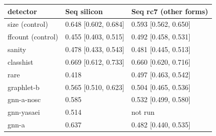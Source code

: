 \begin{tabular}{lll}
\hline
detector & Seq silicon & Seq rc7 (other forms) \\
\hline
size (control) & 0.648 [0.602, 0.684] & 0.593 [0.562, 0.650] \\
ffcount (control) & 0.455 [0.403, 0.515] & 0.492 [0.458, 0.531] \\
sanity & 0.478 [0.433, 0.543] & 0.481 [0.445, 0.513] \\
classhist & 0.669 [0.612, 0.733] & 0.660 [0.620, 0.716] \\
rare & 0.418 & 0.497 [0.463, 0.542] \\
graphlet{-}b & 0.565 [0.510, 0.623] & 0.504 [0.465, 0.536] \\
gnn{-}a{-}nosc & 0.585 & 0.532 [0.499, 0.580] \\
gnn{-}yasaei & 0.514 & not run \\
gnn{-}a & 0.637 & 0.482 [0.440, 0.535] \\
\hline
\end{tabular}
